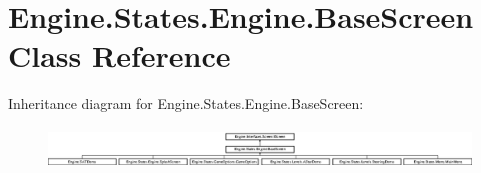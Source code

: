 \hypertarget{a00550}{}\section{Engine.\+States.\+Engine.\+Base\+Screen Class Reference}
\label{a00550}
Inheritance diagram for Engine.\+States.\+Engine.\+Base\+Screen\+:\begin{figure}[H]
\begin{center}
\leavevmode
\includegraphics[height=1.098039cm]{de/de7/a00550}
\end{center}
\end{figure}
